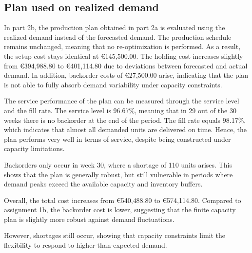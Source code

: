 \documentclass[a4paper,faculty=eb,language=en,doctype=article,sftitles=false]{ugent-doc}
\begin{document}
\subsection{Plan used on realized demand}

In part 2b, the production plan obtained in part 2a is evaluated using the realized demand instead of the forecasted demand. The production schedule remains unchanged, meaning that no re-optimization is performed. As a result, the setup cost stays identical at €145{,}500.00. The holding cost increases slightly from €394{,}988.80 to €401{,}114.80 due to deviations between forecasted and actual demand. In addition, backorder costs of €27{,}500.00 arise, indicating that the plan is not able to fully absorb demand variability under capacity constraints.

The service performance of the plan can be measured through the service level and the fill rate. The service level is 96.67\%, meaning that in 29 out of the 30 weeks there is no backorder at the end of the period. The fill rate equals 98.17\%, which indicates that almost all demanded units are delivered on time. Hence, the plan performs very well in terms of service, despite being constructed under capacity limitations.

Backorders only occur in week 30, where a shortage of 110 units arises. This shows that the plan is generally robust, but still vulnerable in periods where demand peaks exceed the available capacity and inventory buffers.

Overall, the total cost increases from €540{,}488.80 to €574{,}114.80. Compared to assignment 1b, the backorder cost is lower, suggesting that the finite capacity plan is slightly more robust against demand fluctuations.

However, shortages still occur, showing that capacity constraints limit the flexibility to respond to higher-than-expected demand.
\end{document}
